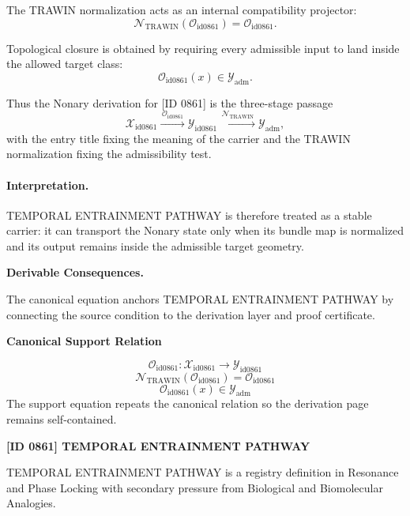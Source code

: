 The TRAWIN normalization acts as an internal compatibility projector:\[
\mathcal{N}_{\mathrm{TRAWIN}}(\mathcal{O}_{\mathrm{id0861}})=\mathcal{O}_{\mathrm{id0861}}.
\]

Topological closure is obtained by requiring every admissible input to land inside the allowed target class:\[
\mathcal{O}_{\mathrm{id0861}}(x)\in\mathcal{Y}_{\mathrm{adm}}.
\]

Thus the Nonary derivation for [ID 0861] is the three-stage passage
\[
\mathcal{X}_{\mathrm{id0861}}\xrightarrow{\,\mathcal{O}_{\mathrm{id0861}}\,} \mathcal{Y}_{\mathrm{id0861}}\xrightarrow{\,\mathcal{N}_{\mathrm{TRAWIN}}\,} \mathcal{Y}_{\mathrm{adm}},
\]
with the entry title fixing the meaning of the carrier and the TRAWIN normalization fixing the admissibility test.

\paragraph{Interpretation.} TEMPORAL ENTRAINMENT PATHWAY is therefore treated as a stable carrier: it can transport the Nonary state only when its bundle map is normalized and its output remains inside the admissible target geometry.

\par\vspace{0.35em}
\noindent\textbf{Derivable Consequences.}\quad
\begingroup
\footnotesize
\raggedright
The canonical equation anchors TEMPORAL ENTRAINMENT PATHWAY by connecting the source condition to the derivation layer and proof certificate.
\par\endgroup

\noindent\textbf{Canonical Support Relation}\par
\[
\mathcal{O}_{\mathrm{id0861}}:\mathcal{X}_{\mathrm{id0861}}\longrightarrow\mathcal{Y}_{\mathrm{id0861}}
\]
\[
\mathcal{N}_{\mathrm{TRAWIN}}(\mathcal{O}_{\mathrm{id0861}})=\mathcal{O}_{\mathrm{id0861}}
\]
\[
\mathcal{O}_{\mathrm{id0861}}(x)\in\mathcal{Y}_{\mathrm{adm}}
\]
\noindent The support equation repeats the canonical relation so the derivation page remains self-contained.\par

\clearpage
\noindent\textbf{[ID 0861] TEMPORAL ENTRAINMENT PATHWAY}\par
\vspace{0.35em}
\begingroup\small
{}
TEMPORAL ENTRAINMENT PATHWAY is a registry definition in Resonance and Phase Locking with secondary pressure from Biological and Biomolecular Analogies.

